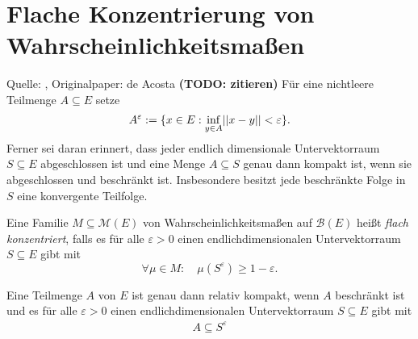 \section{Flache Konzentrierung von Wahrscheinlichkeitsmaßen}
Quelle: \cite{vakhania}, Originalpaper: de Acosta \textbf{(TODO: zitieren)}
Für eine nichtleere Teilmenge $A \subseteq E$ setze 
$$
    A^{\varepsilon} := \{x \in E: \inf_{y\in A}\lvert \lvert x-y \rvert \rvert < \varepsilon \}.
$$
Ferner sei daran erinnert, dass jeder endlich dimensionale Untervektorraum  $S \subseteq E$ abgeschlossen ist und eine Menge $A \subseteq S$ genau dann kompakt ist, wenn sie abgeschlossen und beschränkt ist. 
Insbesondere besitzt jede beschränkte Folge in $S$ eine konvergente Teilfolge. 
\begin{mydef}
    Eine Familie $M \subseteq \mathcal{M}(E)$ von Wahrscheinlichkeitsmaßen auf $\mathcal{B}(E)$ heißt \textit{flach konzentriert}, falls es für alle $\varepsilon > 0$ einen endlichdimensionalen 
    Untervektorraum $S \subseteq E$ gibt mit 
    $$
        \forall \mu \in M: \quad \mu(S^{\varepsilon}) \geq 1 - \varepsilon.
    $$ 
\end{mydef}

\begin{lemma}
    Eine Teilmenge $A$ von $E$ ist genau dann relativ kompakt, wenn $A$ beschränkt ist und es für alle $\varepsilon > 0$ einen endlichdimensionalen Untervektorraum $S \subseteq E$ gibt mit 
    \begin{align*}
        A \subseteq S^{\varepsilon}
    \end{align*}
\end{lemma}

